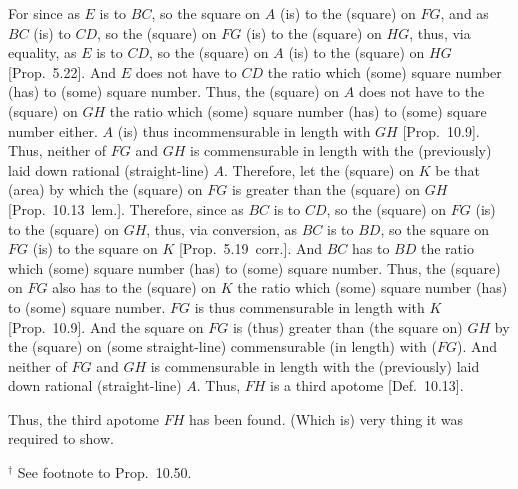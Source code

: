 \begin{Parallel}{}{}
{For since as $E$ is to $BC$, so the square on $A$ (is) to the (square)
on $FG$, and as $BC$ (is) to $CD$, so the (square) on $FG$
(is) to the (square) on $HG$, thus, via equality, as $E$ is to
$CD$, so the (square) on $A$ (is) to the (square) on $HG$ [Prop.~5.22]. And $E$ does not have to $CD$
the ratio which (some) square number (has) to (some) square number. Thus,
the (square) on $A$ does not have to the (square) on $GH$ the ratio
which (some) square number (has) to (some) square number either. 
$A$ (is) thus incommensurable in length with $GH$ [Prop.~10.9]. Thus, neither of $FG$ and $GH$
is commensurable in length with the (previously) laid down rational
(straight-line) $A$. Therefore, let the (square) on $K$ be that (area) by which the (square) on
$FG$ is greater than the (square) on $GH$ [Prop.~10.13~lem.]. Therefore, since as $BC$ is to
$CD$, so the (square) on $FG$ (is) to the (square) on $GH$, thus,
via conversion, as $BC$ is to $BD$, so the square on $FG$ (is) to the square on
$K$ [Prop.~5.19~corr.]. And $BC$ has to $BD$ the ratio which
(some) square number (has) to (some) square number. Thus, the (square)
on $FG$ also has to the (square) on $K$ the ratio which (some)
square number (has) to (some) square number.
$FG$ is thus commensurable in length with $K$ [Prop.~10.9]. And the square on $FG$ is (thus) greater
than (the square on) $GH$ by the (square) on (some straight-line)
commensurable (in length) with ($FG$). And neither of $FG$ and
$GH$ is commensurable in length with the (previously) laid down
rational (straight-line) $A$. Thus, $FH$ is a third
apotome [Def.~10.13].

Thus, the third apotome $FH$ has been found. (Which is) very thing
it was required to show.}
\end{Parallel}
{\footnotesize\noindent$^\dag$ See footnote
to Prop.~10.50.}

